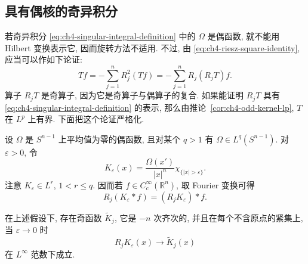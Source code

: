 \hypertarget{chapter-04-page-089}{}
\subsection{具有偶核的奇异积分}
\label{sec:ch4-even-kernel-singular-integrals}

若奇异积分 \eqref{eq:ch4-singular-integral-definition} 中的 $\Omega$ 是偶函数, 就不能用 Hilbert 变换表示它, 因而旋转方法不适用. 不过, 由 \eqref{eq:ch4-riesz-square-identity}, 应当可以作如下论证:
\[
 Tf=-\sum_{j=1}^nR_j^2(Tf)=-\sum_{j=1}^nR_j(R_jT)f.
\]
算子 $R_jT$ 是奇算子, 因为它是奇算子与偶算子的复合. 如果能证明 $R_jT$ 具有 \eqref{eq:ch4-singular-integral-definition} 的表示, 那么由推论~\ref{cor:ch4-odd-kernel-lp}, $T$ 在 $L^p$ 上有界. 下面把这个论证严格化.

设 $\Omega$ 是 $S^{n-1}$ 上平均值为零的偶函数, 且对某个 $q>1$ 有 $\Omega\in L^q(S^{n-1})$. 对 $\varepsilon>0$, 令
\begin{equation}
\label{eq:ch4-truncated-even-kernel}
 K_\varepsilon(x)=\frac{\Omega(x')}{|x|^n}
 \chi_{\{|x|>\varepsilon\}}.
\end{equation}
注意 $K_\varepsilon\in L^r$, $1<r\le q$. 因而若 $f\in C_c^\infty(\mathbb R^n)$, 取 Fourier 变换可得
\begin{equation}
\label{eq:ch4-riesz-convolution-association}
 R_j(K_\varepsilon*f)=(R_jK_\varepsilon)*f.
\end{equation}

\begin{Lemma}
\label{lem:ch4-even-kernel-riesz-limit}
在上述假设下, 存在奇函数 $\widetilde K_j$, 它是 $-n$ 次齐次的, 并且在每个不含原点的紧集上, 当 $\varepsilon\to0$ 时
\[
 R_jK_\varepsilon(x)\longrightarrow\widetilde K_j(x)
\]
在 $L^\infty$ 范数下成立.
\end{Lemma}

